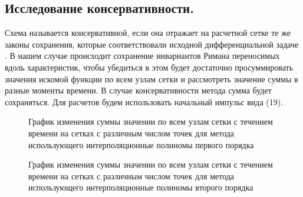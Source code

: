 \documentclass[14pt]{article}
\begin{document}
\subsection{Исследование консервативности.}
Схема называется консервативной, если она отражает на  расчетной сетке те же законы сохранения, которые соответствовали исходной дифференциальной задаче \cite{21}. В нашем случае происходит сохранение инвариантов Римана переносимых вдоль характеристик, чтобы убедиться в этом будет достаточно просуммировать значения искомой функции по всем узлам сетки и рассмотреть значение суммы в разные моменты времени. В случае консервативности метода сумма будет сохраняться. Для расчетов будем использовать начальный импульс вида (19).
\begin{figure}[H]
\caption{График изменения суммы значении по всем узлам сетки с течением времени на сетках с различным числом точек для метода использующего интерполяционные полиномы первого порядка}
\end{figure}
\begin{figure}[H]
\caption{График изменения суммы значении по всем узлам сетки с течением времени на сетках с различным числом точек для метода использующего интерполяционные полиномы второго порядка}
\end{figure}
\end{document}
